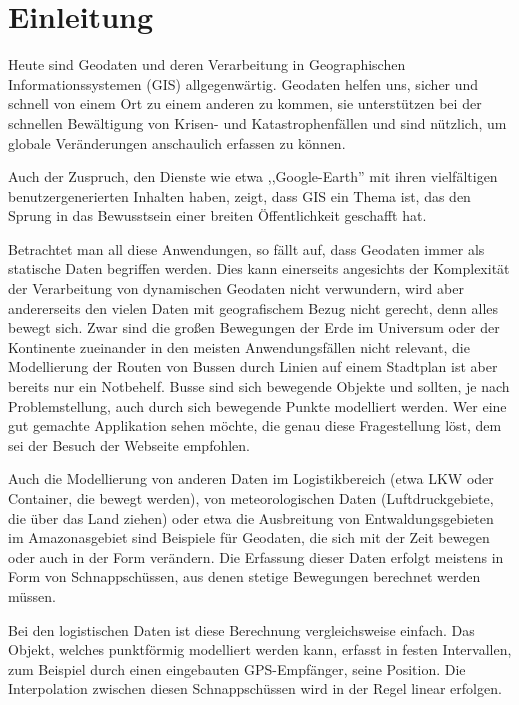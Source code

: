 
\chapter[Einleitung]{Einleitung} \label{Kapitel1}


Heute sind Geodaten und deren Verarbeitung  in Geographischen Informationssystemen (GIS) allgegenwärtig. Geodaten helfen uns, sicher und schnell von einem Ort zu einem anderen zu kommen, sie unterstützen bei der schnellen Bewältigung von Krisen- und Katastrophenfällen und sind nützlich, um globale Veränderungen anschaulich erfassen zu können.

Auch der Zuspruch, den Dienste wie etwa ,,Google-Earth'' mit ihren vielfältigen benutzergenerierten Inhalten haben, zeigt, dass GIS ein Thema ist, das den Sprung in das Bewusstsein einer breiten Öffentlichkeit geschafft hat. 

Betrachtet man all diese Anwendungen, so fällt auf, dass Geodaten immer als statische Daten begriffen werden. Dies kann einerseits angesichts der Komplexität der Verarbeitung von dynamischen Geodaten nicht verwundern, wird aber andererseits den vielen Daten mit geografischem Bezug nicht gerecht, denn alles bewegt sich. Zwar sind die großen Bewegungen der Erde im Universum oder der Kontinente zueinander in den meisten Anwendungsfällen nicht relevant, die Modellierung der Routen von Bussen durch Linien auf einem Stadtplan ist aber bereits nur ein Notbehelf. Busse sind sich bewegende Objekte und sollten, je nach Problemstellung, auch durch sich bewegende Punkte modelliert werden. Wer eine gut gemachte Applikation sehen möchte, die genau diese Fragestellung löst, dem sei der Besuch der Webseite \cite{swR} empfohlen.

Auch die Modellierung von anderen Daten im Logistikbereich (etwa LKW oder Container, die bewegt werden), von meteorologischen Daten (Luftdruckgebiete, die über das Land ziehen) oder etwa die Ausbreitung von Entwaldungsgebieten im Amazonasgebiet sind Beispiele für Geodaten, die sich mit der Zeit bewegen oder auch in der Form verändern. Die Erfassung dieser  Daten erfolgt meistens in Form von Schnappschüssen, aus denen stetige Bewegungen berechnet werden müssen. 

Bei den logistischen Daten ist diese Berechnung vergleichsweise  einfach. Das Objekt, welches punktförmig modelliert werden kann, erfasst in festen Intervallen, zum Beispiel durch einen eingebauten GPS-Empfänger, seine Position.  Die Interpolation zwischen diesen Schnappschüssen wird in der Regel linear erfolgen. 

